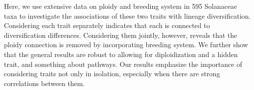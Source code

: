 Here, we use extensive data on ploidy and breeding system in 595 Solanaceae taxa to investigate the associations of these two traits with lineage diversification.
Considering each trait separately indicates that each is connected to diversification differences.
Considering them jointly, however, reveals that the ploidy connection is removed by incorporating breeding system.
We further show that the general results are robust to allowing for diploidization and a hidden trait, and something about pathways. %
Our results emphasize the importance of considering traits not only in isolation, especially when there are strong correlations between them.







